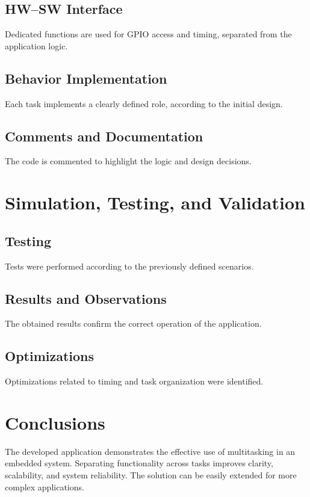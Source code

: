 \documentclass[12pt,a4paper]{article}
\begin{document}
\subsection{HW--SW Interface}
Dedicated functions are used for GPIO access and timing, separated from the application logic.

\subsection{Behavior Implementation}
Each task implements a clearly defined role, according to the initial design.

\subsection{Comments and Documentation}
The code is commented to highlight the logic and design decisions.

\section{Simulation, Testing, and Validation}

\subsection{Testing}
Tests were performed according to the previously defined scenarios.

\subsection{Results and Observations}
The obtained results confirm the correct operation of the application.

\subsection{Optimizations}
Optimizations related to timing and task organization were identified.

\section{Conclusions}

The developed application demonstrates the effective use of multitasking in an embedded system.
Separating functionality across tasks improves clarity, scalability, and system reliability.
The solution can be easily extended for more complex applications.
\end{document}
